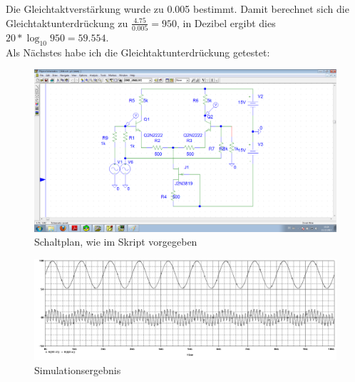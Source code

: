 Die Gleichtaktverstärkung wurde zu 0.005 bestimmt. Damit berechnet sich die Gleichtaktunterdrückung zu $ \frac{4.75}{0.005}=950 $, in Dezibel ergibt dies $ 20*\log_{10}{950} = 59.554 $.\\
Als Nächstes habe ich die Gleichtaktunterdrückung getestet:
\begin{figure}[H]
	\centering
	\includegraphics[width=\linewidth]{versuch6/spice/schem616.png}
	\caption{Schaltplan, wie im Skript vorgegeben}
\end{figure}
\begin{figure}[H]
	\centering
	\includegraphics[width=\linewidth]{versuch6/spice/616.png}
	\caption{Simulationsergebnis}
\end{figure}


